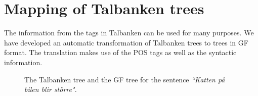 \documentclass[10pt, a4paper]{article}
\begin{document}
\section{Mapping of Talbanken trees}
\label{sec:mapping}
The information from the tags in Talbanken can be used for many purposes.
We have developed an automatic transformation of Talbanken trees 
to trees in GF format. The translation makes use of the POS tags as well as
the syntactic information. 
\begin{figure}[!h]
\begin{center}
\hspace{-30mm}
\hspace{-10mm}
\caption{The Talbanken tree and the GF tree for the sentence \emph{``Katten
p{\aa} bilen blir st{\"o}rre".}}
\label{fig:translationtrees}
\end{center}
\end{figure}
\end{document}

